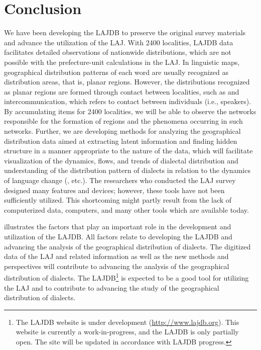 \documentclass[output=paper]{LSP/langsci}
\begin{document}
\section{Conclusion}
We have been developing the LAJDB to preserve the original survey materials and advance the utilization of the LAJ. With 2400 localities, LAJDB data facilitates detailed observations of nationwide distributions, which are not possible with the prefecture-unit calculations in the LAJ. In linguistic maps, geographical distribution patterns of each word are usually recognized as distribution areas, that is, planar regions. However, the distributions recognized as planar regions are formed through contact between localities, such as  and intercommunication, which refers to contact between individuals (i.e., speakers). By accumulating items for 2400 localities, we will be able to observe the networks responsible for the formation of regions and the phenomena occurring in such networks. Further, we are developing methods for analyzing the geographical distribution data aimed at extracting latent information and finding hidden structure in a manner appropriate to the nature of the data, which will facilitate visualization of the dynamics, flows, and trends of dialectal distribution and understanding of the distribution pattern of dialects in relation to the dynamics of language change (\citealt{sibata_s&k_1993,kumagai_nihon_2013,kumagai_development_2013}, etc.). The researchers who conducted the LAJ survey designed many features and devices; however, these tools have not been sufficiently utilized. This shortcoming might partly result from the lack of computerized data, computers, and many other tools which are available today. 

 illustrates the factors that play an important role in the development and utilization of the LAJDB. All factors relate to developing the LAJDB and advancing the analysis of the geographical distribution of dialects. The digitized data of the LAJ and related information as well as the new methods and perspectives will contribute to advancing the analysis of the geographical distribution of dialects. The LAJDB\footnote{The LAJDB website is under development (\url{http://www.lajdb.org}). This website is currently a work-in-progress, and the LAJDB is only partially open. The site will be updated in accordance with LAJDB progress.} is expected to be a good tool for utilizing the LAJ and to contribute to advancing the study of the geographical distribution of dialects. 
\end{document}
